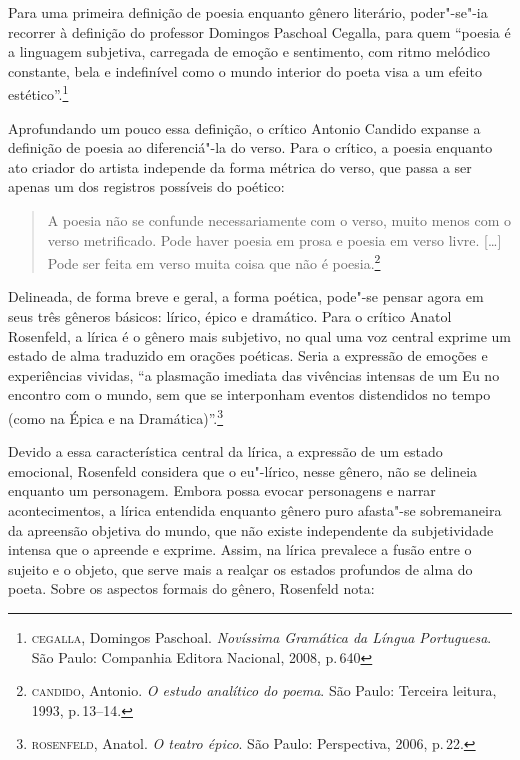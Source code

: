 Para uma primeira definição de poesia enquanto gênero literário, poder"-se"-ia recorrer à definição do professor Domingos Paschoal Cegalla, para quem ``poesia é a linguagem subjetiva, carregada de emoção e sentimento, com ritmo melódico constante, bela e indefinível como o mundo interior do poeta visa a um efeito estético''.\footnote{\textsc{cegalla}, Domingos Paschoal. \textit{Novíssima Gramática da Língua Portuguesa}. São Paulo: Companhia Editora Nacional, 2008, p.\,640}

Aprofundando um pouco essa definição, o crítico Antonio Candido expanse a definição de poesia ao diferenciá"-la do verso.
Para o crítico, a poesia enquanto ato criador do artista independe da forma métrica do verso, que passa a ser apenas um dos registros possíveis do poético:

\begin{quote}
A poesia não se confunde necessariamente com o verso, muito menos com o verso metrificado. Pode haver poesia em prosa e poesia em verso livre. [\ldots]
Pode ser feita em verso muita coisa que não é poesia.\footnote{\textsc{candido}, Antonio. \textit{O estudo analítico do poema}. São Paulo: Terceira leitura, 1993, p.\,13--14.}
\end{quote}

Delineada, de forma breve e geral, a forma poética, pode"-se pensar agora em seus três gêneros básicos: lírico, épico e dramático.
Para o crítico Anatol Rosenfeld, a lírica é o gênero mais subjetivo, no qual uma voz central exprime um estado de alma traduzido em orações poéticas.
Seria a expressão de emoções e experiências vividas, ``a plasmação imediata das vivências intensas de um Eu no encontro com o mundo, sem que se interponham eventos distendidos no tempo (como na Épica e na Dramática)''.\footnote{\textsc{rosenfeld}, Anatol. \textit{O teatro épico}. São Paulo: Perspectiva, 2006, p.\,22.}

Devido a essa característica central da lírica, a expressão de um estado emocional, Rosenfeld considera que o eu"-lírico, nesse gênero, não se delineia enquanto um personagem. Embora possa evocar personagens e narrar acontecimentos, a lírica entendida enquanto gênero puro afasta"-se sobremaneira da apreensão objetiva do mundo, que não existe independente da subjetividade intensa que o apreende e exprime. Assim, na lírica prevalece a fusão entre o sujeito e o objeto, que serve mais a realçar os estados profundos de alma do poeta.
Sobre os aspectos formais do gênero, Rosenfeld nota:

